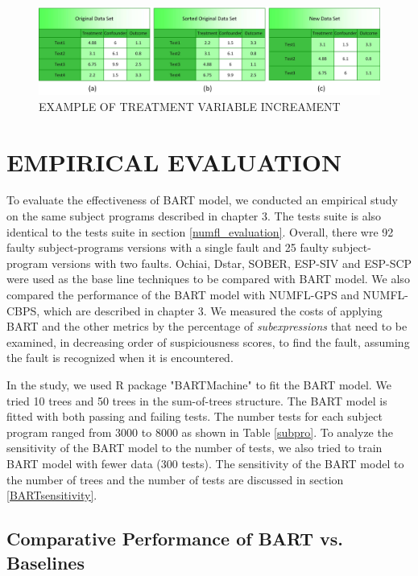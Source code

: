 \begin{figure}[!thpb]
\centering
\includegraphics[width=1\textwidth]{chapter4_BART_ACE.pdf}
\caption{EXAMPLE OF TREATMENT VARIABLE INCREAMENT}
\label{bartace}
\end{figure}

\section{EMPIRICAL EVALUATION}\label{BARTevaluation}%

To evaluate the effectiveness of BART model, we conducted an empirical study on the same subject programs described in chapter 3.  The tests suite is also identical to the tests suite in section \ref{numfl_evaluation}.  Overall, there wre 92 faulty subject-programs versions with a single fault and 25 faulty subject-program versions with two faults. Ochiai, Dstar, SOBER, ESP-SIV and ESP-SCP were used as the base line techniques to be compared with BART model. We also compared the performance of the BART model with NUMFL-GPS and NUMFL-CBPS, which are described in chapter 3. We measured the costs of applying BART and the other metrics by the percentage of {\it subexpressions} that need to be examined, in decreasing order of suspiciousness scores, to find the fault, assuming the fault is recognized when it is encountered.

In the study, we used R package "BARTMachine" \cite{BARTMachine} to fit the BART model. We tried 10 trees and 50 trees in the sum-of-trees structure.  The BART model is fitted with both passing and failing tests. The number tests for each subject program ranged from 3000 to 8000 as shown in Table \ref{subpro}. To analyze the sensitivity of the BART model to the number of  tests, we also tried to train BART model with fewer data (300 tests). The sensitivity of the BART model to the number of trees and the number of tests are discussed in section \ref{BARTsensitivity}.

\subsection{Comparative Performance of BART vs. Baselines}

